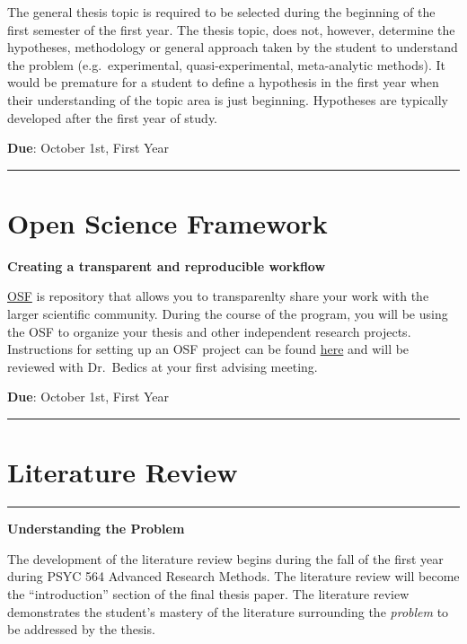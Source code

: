 \documentclass[openany]{book}
\begin{document}
The general thesis topic is required to be selected during the beginning of the first semester of the first year. The thesis topic, does not, however, determine the hypotheses, methodology or general approach taken by the student to understand the problem (e.g.~experimental, quasi-experimental, meta-analytic methods). It would be premature for a student to define a hypothesis in the first year when their understanding of the topic area is just beginning. Hypotheses are typically developed after the first year of study.

\textbf{Due}: October 1st, First Year

\begin{center}\rule{0.5\linewidth}{0.5pt}\end{center}

\hypertarget{open-science-framework}{%
\section{Open Science Framework}\label{open-science-framework}}

\textbf{Creating a transparent and reproducible workflow}

\href{https://osf.io/}{OSF} is repository that allows you to transparenlty share your work with the larger scientific community. During the course of the program, you will be using the OSF to organize your thesis and other independent research projects. Instructions for setting up an OSF project can be found \href{https://speakerdeck.com/jdbedics/osf-setup-and-class-project-introduction}{here} and will be reviewed with Dr.~Bedics at your first advising meeting.

\textbf{Due}: October 1st, First Year

\begin{center}\rule{0.5\linewidth}{0.5pt}\end{center}

\hypertarget{literature-review}{%
\section{Literature Review}\label{literature-review}}

\begin{center}\rule{0.5\linewidth}{0.5pt}\end{center}

\textbf{Understanding the Problem}

The development of the literature review begins during the fall of the first year during PSYC 564 Advanced Research Methods. The literature review will become the ``introduction'' section of the final thesis paper. The literature review demonstrates the student's mastery of the literature surrounding the \emph{problem} to be addressed by the thesis.
\end{document}
